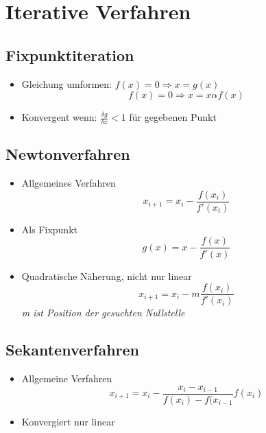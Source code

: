 \section{Iterative Verfahren}

\subsection{Fixpunktiteration}
\begin{itemize}

	\item Gleichung umformen: $f(x) = 0 \Rightarrow x = g(x)$\\
	\begin{equation*}
		f(x) = 0 \Rightarrow x = x \alpha f(x)
	\end{equation*}
	
	\item Konvergent wenn: $\frac{\delta g}{\delta x} < 1$ für gegebenen Punkt\\

\end{itemize}

\subsection{Newtonverfahren}
\begin{itemize}

	\item Allgemeines Verfahren
	\begin{equation*}
		x_{i+1} = x_i - \frac{f(x_i)}{f'(x_i)}
	\end{equation*}
	
	\item Als Fixpunkt
	\begin{equation*}
		g(x) = x - \frac{f(x)}{f'(x)}
	\end{equation*}
	
	\item Quadratische Näherung, nicht nur linear
	\begin{equation*}
		x_{i+1} = x_i - m \frac{f(x_i)}{f'(x_i)}
	\end{equation*}
	\textit{m ist Position der gesuchten Nullstelle}

\end{itemize}

\subsection{Sekantenverfahren}
\begin{itemize}

	\item Allgemeine Verfahren
	\begin{equation*}
		x_{i+1} = x_i - \frac{x_i - x_{i-1}}{f(x_i) - f(x_{i-1}} f(x_i)
	\end{equation*}
	
	\item Konvergiert nur linear

\end{itemize}

